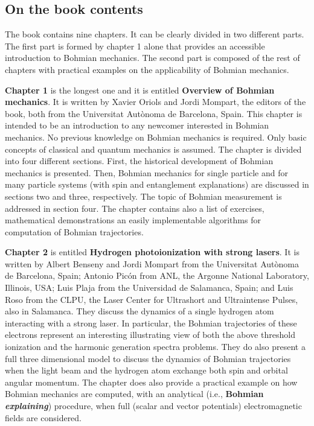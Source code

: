 \documentclass[onecolumn,nofootinbib, secnumarabic, amsmath, nobibnotes,12pt,aps,pra]{revtex4-1}
\begin{document}
\subsection*{On the book contents}

The book contains nine chapters. It can be clearly divided in two different parts. The first part is formed by chapter 1 alone that provides an accessible introduction to Bohmian mechanics. The second part is composed of the rest of chapters with practical examples on the applicability of Bohmian mechanics.

\textbf{Chapter 1} is the longest one and it is entitled \textbf{Overview of Bohmian mechanics}. It is written by Xavier Oriols and Jordi Mompart, the editors of the book, both from the Universitat Aut\`{o}noma de Barcelona, Spain. This chapter is intended to be an introduction to any newcomer interested in Bohmian mechanics. No previous knowledge on Bohmian mechanics is required. Only basic concepts of classical and quantum mechanics is assumed. The chapter is divided into four different sections. First, the historical development of Bohmian mechanics is presented. Then, Bohmian mechanics for single particle and for many particle systems (with spin and entanglement explanations) are discussed in sections two and three, respectively. The topic of Bohmian measurement is addressed in section four. The chapter contains also a list of exercises, mathematical demonstrations an easily implementable algorithms for computation of Bohmian trajectories.

\textbf{Chapter 2} is entitled \textbf{Hydrogen photoionization with strong lasers}. It is written by Albert Benseny and Jordi Mompart from the Universitat Aut\`{o}noma de Barcelona, Spain; Antonio Pic\'on from ANL, the Argonne National Laboratory, Illinois, USA; Luis Plaja from the Universidad de Salamanca, Spain; and Luis Roso from the CLPU, the Laser Center for Ultrashort and Ultraintense Pulses, also in Salamanca.
They discuss the dynamics of a single hydrogen atom interacting with a strong laser. In particular, the Bohmian trajectories of these electrons represent an interesting illustrating view of both the above threshold ionization and the harmonic generation spectra problems. They do also present a full three dimensional model to discuss the dynamics of Bohmian trajectories when the light beam and the hydrogen atom exchange both spin and orbital angular momentum. The chapter does also provide a practical example on how Bohmian mechanics are computed, with an analytical (i.e., \textbf{Bohmian \emph{explaining}}) procedure, when full (scalar and vector potentials) electromagnetic fields are considered.
\end{document}
